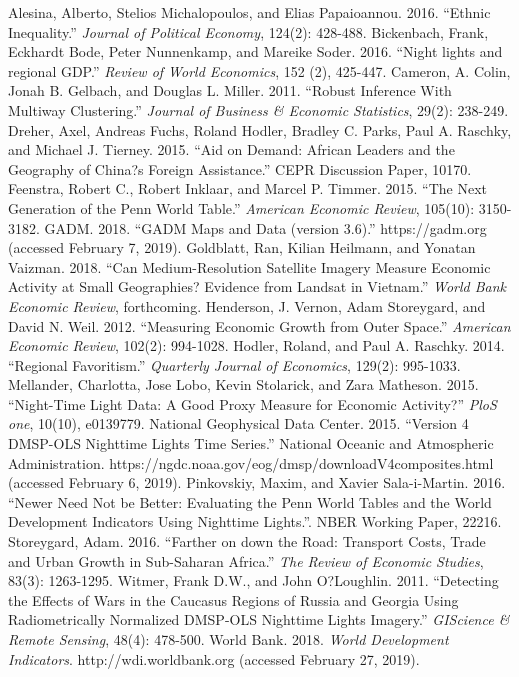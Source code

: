\documentclass[12pt,a4paper]{article}%
\begin{document}
\begin{thebibliography}{99}                                                                                                %
\bibitem{} Alesina, Alberto, Stelios Michalopoulos, and Elias Papaioannou. 2016. ``Ethnic Inequality.'' \textit{Journal of Political Economy}, 124(2): 428-488.
\bibitem{} Bickenbach, Frank, Eckhardt Bode, Peter Nunnenkamp, and Mareike Soder. 2016. ``Night lights and regional GDP.'' \textit{Review of World Economics}, 152 (2), 425-447.                                                                                         
\bibitem{} Cameron, A. Colin, Jonah B. Gelbach, and Douglas L. Miller. 2011. ``Robust Inference With Multiway Clustering.'' \textit{Journal of Business \& Economic Statistics}, 29(2): 238-249.
\bibitem{} Dreher, Axel, Andreas Fuchs, Roland Hodler, Bradley C. Parks, Paul A. Raschky, and Michael J. Tierney. 2015. ``Aid on Demand: African Leaders and the Geography of China?s Foreign Assistance.'' CEPR Discussion Paper, 10170.
\bibitem{} Feenstra, Robert C., Robert Inklaar, and Marcel P. Timmer. 2015. ``The Next Generation of the Penn World Table.'' \textit{American Economic Review}, 105(10): 3150-3182.
\bibitem{} GADM. 2018. ``GADM Maps and Data (version 3.6).'' https://gadm.org (accessed February 7, 2019).
\bibitem{} Goldblatt, Ran, Kilian Heilmann, and Yonatan Vaizman. 2018. ``Can Medium-Resolution Satellite Imagery Measure Economic Activity at Small Geographies? Evidence from Landsat in Vietnam.'' \textit{World Bank Economic Review}, forthcoming.
\bibitem{} Henderson, J. Vernon, Adam Storeygard, and David N. Weil. 2012. ``Measuring Economic Growth from Outer Space.'' \textit{American Economic Review}, 102(2): 994-1028.
\bibitem{} Hodler, Roland, and Paul A. Raschky. 2014. ``Regional Favoritism.'' \textit{Quarterly Journal of Economics}, 129(2): 995-1033.
\bibitem{} Mellander, Charlotta, Jose Lobo, Kevin Stolarick, and Zara Matheson. 2015. ``Night-Time Light Data: A Good Proxy Measure for Economic Activity?'' \textit{PloS one}, 10(10), e0139779.
\bibitem{} National Geophysical Data Center. 2015. ``Version 4 DMSP-OLS Nighttime Lights Time Series.'' National Oceanic and Atmospheric Administration. https://ngdc.noaa.gov/eog/dmsp/downloadV4composites.html (accessed February 6, 2019).
\bibitem{} Pinkovskiy, Maxim, and Xavier Sala-i-Martin. 2016. ``Newer Need Not be Better: Evaluating the Penn World Tables and the World Development Indicators Using Nighttime Lights.''. NBER Working Paper, 22216.
\bibitem{} Storeygard, Adam. 2016. ``Farther on down the Road: Transport Costs, Trade and Urban Growth in Sub-Saharan Africa.'' \textit{The Review of Economic Studies}, 83(3): 1263-1295.
\bibitem{} Witmer, Frank D.W., and John O?Loughlin. 2011. ``Detecting the Effects of Wars in the Caucasus Regions of Russia and Georgia Using Radiometrically Normalized DMSP-OLS Nighttime Lights Imagery.'' \textit{GIScience \& Remote Sensing}, 48(4): 478-500.
\bibitem{} World Bank. 2018. \textit{World Development Indicators}. http://wdi.worldbank.org (accessed February 27, 2019).
\end{thebibliography}
\end{document}
